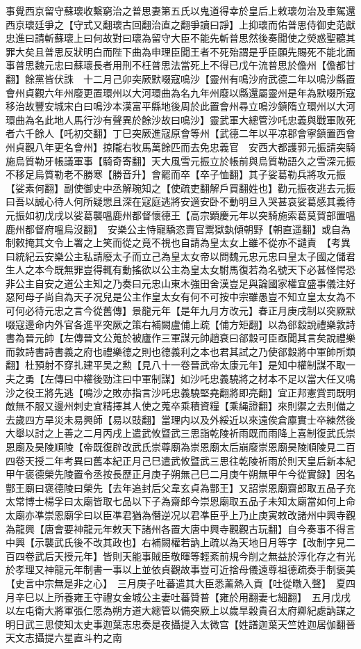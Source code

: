 事覺西京留守蘇瓌收繫窮治之普思妻第五氏以鬼道得幸於皇后上敕瓌勿治及車駕還西京瓌廷爭之【守式又翻瓌古回翻治直之翻爭讀曰諍】上抑瓌而佑普思侍御史范獻忠進曰請斬蘇瓌上曰何故對曰瓌為留守大臣不能先斬普思然後奏聞使之熒惑聖聽其罪大矣且普思反狀明白而陛下曲為申理臣聞王者不死殆謂是乎臣願先賜死不能北面事普思魏元忠曰蘇瓌長者用刑不枉普思法當死上不得已戊午流普思於儋州【儋都甘翻】餘黨皆伏誅　十二月己卯突厥默啜寇鳴沙【靈州有鳴沙府武德二年以鳴沙縣置會州貞觀六年州廢更置環州以大河環曲為名九年州廢以縣還屬靈州是年為默啜所寇移治故豐安城宋白曰鳴沙本漢富平縣地後周於此置會州尋立鳴沙鎮隋立環州以大河環曲為名此地人馬行沙有聲異於餘沙故曰鳴沙】靈武軍大總管沙吒忠義與戰軍敗死者六千餘人【吒初交翻】丁巳突厥進寇原會等州【武德二年以平凉郡會寧鎮置西會州貞觀八年更名會州】掠隴右牧馬萬餘匹而去免忠義官　安西大都護郭元振請突騎施烏質勒牙帳議軍事【騎奇寄翻】天大風雪元振立於帳前與烏質勒語久之雪深元振不移足烏質勒老不勝寒【勝音升】會罷而卒【卒子恤翻】其子娑葛勒兵將攻元振【娑素何翻】副使御史中丞解琬知之【使疏吏翻解戶買翻姓也】勸元振夜逃去元振曰吾以誠心待人何所疑愳且深在寇庭逃將安適安卧不動明旦入哭甚哀娑葛感其義待元振如初戊戌以娑葛襲嗢鹿州都督懷德王【高宗顕慶元年以突騎施索葛莫賀部置嗢鹿州都督府嗢烏沒翻】　安樂公主恃寵驕恣賣官鬻獄埶傾朝野【朝直遥翻】或自為制敕掩其文令上署之上笑而從之竟不視也自請為皇太女上雖不從亦不譴責　【考異曰統紀云安樂公主私請廢太子而立己為皇太女帝以問魏元忠元忠曰皇太子國之儲君生人之本今既無罪豈得輒有動搖欲以公主為皇太女駙馬復若為名號天下必甚怪愕恐非公主自安之道公主知之乃奏曰元忠山東木強田舍漢豈足與論國家權宜盛事儀注好惡阿母子尚自為天子况兒是公主作皇太女有何不可按中宗雖愚豈不知立皇太女為不可何必待元忠之言今從舊傳】景龍元年【是年九月方改元】春正月庚戌制以突厥默啜寇邊命内外官各進平突厥之策右補闕盧俌上疏【俌方矩翻】以為郤縠說禮樂敦詩書為晉元帥【左傳晉文公蒐於被廬作三軍謀元帥趙衰曰郤縠可臣亟聞其言矣說禮樂而敦詩書詩書義之府也禮樂德之則也德義利之本也君其試之乃使郤縠將中軍帥所類翻】杜預射不穿扎建平吴之勲【見八十一卷晉武帝太康元年】是知中權制謀不取一夫之勇【左傳曰中權後勁注曰中軍制謀】如沙吒忠義驍將之材本不足以當大任又鳴沙之役王將先逃【鳴沙之敗亦指言沙吒忠義驍堅堯翻將即亮翻】宜正邦憲賞罰既明敵無不服又邊州刺史宜精擇其人使之蒐卒乘積資糧【乘䋲證翻】來則禦之去則備之去歲四方旱災未易興師【易以豉翻】當理内以及外綏近以來遠俟倉廪實士卒練然後大舉以討之上善之二月丙戌上遣武攸暨武三思詣乾陵祈雨既而雨降上喜制復武氏崇恩廟及昊陵順陵【帝既復辟改武氏崇尊廟為崇恩廟太后崩廢崇恩廟昊陵順陵見二百四卷天授二年考異曰舊本紀正月己巳遣武攸暨武三思往乾陵祈雨於則天皇后新本紀甲午褒德榮先陵置令丞按長歷正月庚子朔無己巳二月庚午朔無甲午今從實録】因名酆王廟曰褒德陵曰榮先【去年追封后父韋玄貞為酆王】又詔崇恩廟齋郎取五品子充太常博士楊孚曰太廟皆取七品以下子為齋郎今崇恩廟取五品子未知太廟當如何上命太廟亦凖崇恩廟孚曰以臣凖君猶為僭逆况以君凖臣乎上乃止庚寅敕改諸州中興寺觀為龍興【唐會要神龍元年敕天下諸州各置大唐中興寺觀觀古玩翻】自今奏事不得言中興【示襲武氏後不改其政也】右補闕權若訥上疏以為天地日月等字【改制字見二百四卷武后天授元年】皆則天能事賊臣敬暉等輕紊前規今削之無益於淳化存之有光於孝理又神龍元年制書一事以上並依貞觀故事豈可近捨母儀遠尊祖德疏奏手制褒美【史言中宗無是非之心】　三月庚子吐蕃遣其大臣悉薰熱入貢【吐從暾入聲】　夏四月辛巳以上所養雍王守禮女金城公主妻吐蕃贊普【雍於用翻妻七細翻】　五月戊戌以左屯衛大將軍張仁愿為朔方道大總管以備突厥上以歲旱穀貴召太府卿紀處訥謀之明日武三思使知太史事迦葉志忠奏是夜攝提入太微宫【姓譜迦葉天竺姓迦居伽翻晉天文志攝提六星直斗杓之南